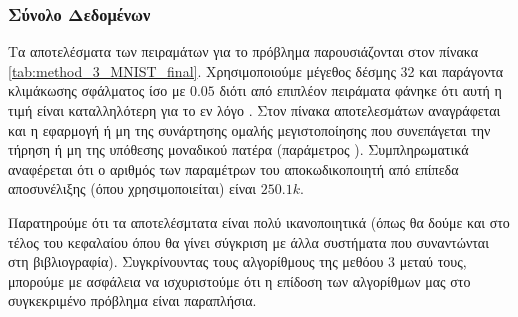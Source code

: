 \subsubsection{Σύνολο Δεδομένων }

Τα αποτελέσματα των πειραμάτων για το πρόβλημα  παρουσιάζονται στον πίνακα \ref{tab:method_3_MNIST_final}. Χρησιμοποιούμε μέγεθος δέσμης 32 και παράγοντα κλιμάκωσης σφάλματος ίσο με $0.05$ διότι από επιπλέον πειράματα φάνηκε ότι αυτή η τιμή είναι καταλληλότερη για το εν λόγο . Στον πίνακα αποτελεσμάτων αναγράφεται και η εφαρμογή ή μη της συνάρτησης ομαλής μεγιστοποίησης που συνεπάγεται την τήρηση ή μη της υπόθεσης μοναδικού πατέρα (παράμετρος ). Συμπληρωματικά αναφέρεται ότι ο αριθμός των παραμέτρων του αποκωδικοποιητή από επίπεδα αποσυνέλιξης (όπου χρησιμοποιείται) είναι $250.1k$.

\begin{table}[h]
    \begin{center}
    \end{center}
    \caption[]{\label{tab:method_3_MNIST_final}Επίδωση των αλγορίθμων της μεθόδου 3 στο σύνολο δεδομένων , όταν χρησιμοποιούνται 30 εποχές για την εκπαίδευση του μοντέλου με μέγεθος δέσμης 32.} 
\end{table}

Παρατηρούμε ότι τα αποτελέσμτατα είναι πολύ ικανοποιητικά (όπως θα δούμε και στο τέλος του κεφαλαίου όπου θα γίνει σύγκριση με άλλα συστήματα που συναντώνται στη βιβλιογραφία). Συγκρίνουντας τους αλγορίθμους της μεθόου 3 μεταύ τους, μπορούμε με ασφάλεια να ισχυριστούμε ότι η επίδοση των αλγορίθμων μας στο συγκεκριμένο πρόβλημα είναι παραπλήσια. \par

